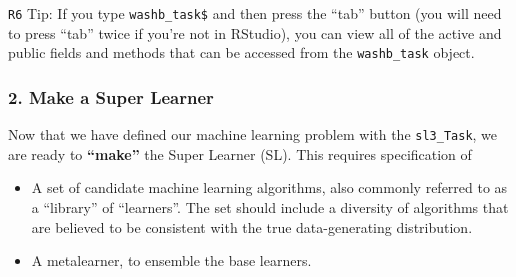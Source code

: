 \documentclass[12pt, krantz2,]{krantz}
\newenvironment{Shaded}{\begin{snugshade}}{\end{snugshade}}
\newcommand{\CommentTok}[1]{\textcolor[rgb]{0.37,0.37,0.37}{\textit{#1}}}
\newcommand{\DecValTok}[1]{\textcolor[rgb]{0.06,0.06,0.06}{#1}}
\newcommand{\KeywordTok}[1]{\textcolor[rgb]{0.27,0.27,0.27}{\textbf{#1}}}
\newcommand{\NormalTok}[1]{#1}
\newcommand{\OperatorTok}[1]{\textcolor[rgb]{0.43,0.43,0.43}{\textbf{#1}}}
\newcommand{\OtherTok}[1]{\textcolor[rgb]{0.37,0.37,0.37}{#1}}
\newcommand{\StringTok}[1]{\textcolor[rgb]{0.5,0.5,0.5}{#1}}
\providecommand{\tightlist}{%
  \setlength{\itemsep}{0pt}\setlength{\parskip}{0pt}}
\theoremstyle{definition}
\theoremstyle{definition}
\theoremstyle{definition}
\newcommand{\1}{\mathbbm{1}}
\begin{document}
\begin{Shaded}
\end{Shaded}

\texttt{R6} Tip: If you type \texttt{washb\_task\$} and then press the ``tab'' button (you will
need to press ``tab'' twice if you're not in RStudio), you can view all of the
active and public fields and methods that can be accessed from the \texttt{washb\_task}
object.

\hypertarget{make-a-super-learner}{%
\subsubsection*{2. Make a Super Learner}\label{make-a-super-learner}}


Now that we have defined our machine learning problem with the \texttt{sl3\_Task}, we
are ready to \textbf{``make''} the Super Learner (SL). This requires specification of

\begin{itemize}
\tightlist
\item
  A set of candidate machine learning algorithms, also commonly referred to as
  a ``library'' of ``learners''. The set should include a diversity of algorithms
  that are believed to be consistent with the true data-generating
  distribution.
\item
  A metalearner, to ensemble the base learners.
\end{itemize}
\end{document}

